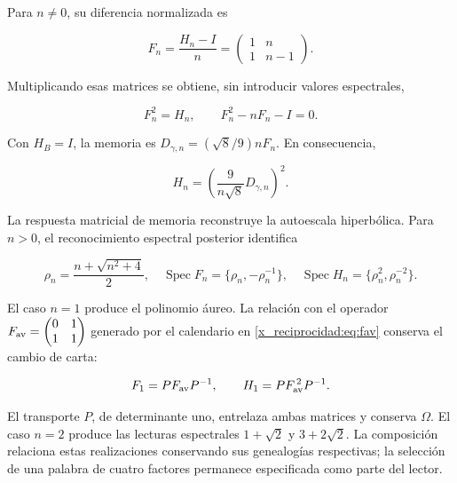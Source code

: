 Para \(n\ne0\), su diferencia normalizada es



\[
F_n=\frac{H_n-I}{n}
=\begin{pmatrix}1&n\\1&n-1\end{pmatrix}.
\]



Multiplicando esas matrices se obtiene, sin introducir valores espectrales,



\begin{equation}
\boxed{F_n^2=H_n,\qquad F_n^2-nF_n-I=0.}
\label{x_reciprocidad:nuc11:eq:29}
\end{equation}



Con \(H_B=I\), la memoria es
\(D_{\gamma,n}=(\sqrt8/9)nF_n\).
En consecuencia,



\begin{equation}
\boxed{H_n=\left(\frac9{n\sqrt8}D_{\gamma,n}\right)^2.}
\label{x_reciprocidad:nuc11:eq:30}
\end{equation}



La respuesta matricial de memoria reconstruye la autoescala
hiperbólica. Para \(n>0\), el reconocimiento espectral posterior
identifica



\begin{equation}
\rho_n=\frac{n+\sqrt{n^2+4}}2,\quad
\operatorname{Spec}F_n=\{\rho_n,-\rho_n^{-1}\},\quad
\operatorname{Spec}H_n=\{\rho_n^2,\rho_n^{-2}\}.
\label{x_reciprocidad:nuc11:eq:31}
\end{equation}



El caso \(n=1\) produce el polinomio áureo.
La relación con el operador
\(F_{\rm av}=\begin{pmatrix}0&1\\1&1\end{pmatrix}\)
generado por el calendario en \eqref{x_reciprocidad:eq:fav} conserva el cambio
de carta:



\begin{equation}
F_1=PF_{\rm av}P^{-1},\qquad
H_1=PF_{\rm av}^{\,2}P^{-1}.
\label{x_reciprocidad:nuc11:eq:32}
\end{equation}



El transporte \(P\), de determinante uno, entrelaza ambas
matrices y conserva \(\Omega\).
El caso \(n=2\) produce las lecturas espectrales
\(1+\sqrt2\) y \(3+2\sqrt2\).
La composición relaciona estas realizaciones conservando sus
genealogías respectivas; la selección de una palabra de cuatro
factores permanece especificada como parte del lector.

